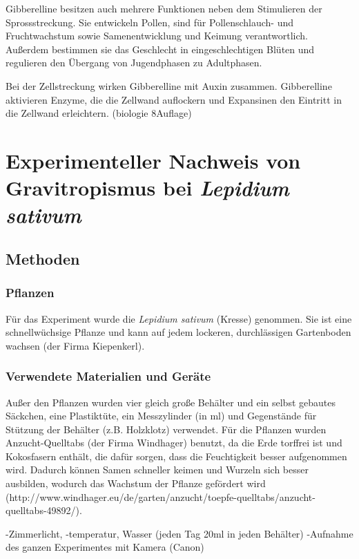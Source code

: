 \documentclass[
a4paper, 
11pt, 
ngerman,
listof=totoc,
bibliography=totocnumbered,
abstracton
]{scrreprt}
\begin{document}
Gibberelline besitzen auch mehrere Funktionen neben dem Stimulieren der Sprossstreckung.
Sie entwickeln Pollen, sind für Pollenschlauch- und Fruchtwachstum sowie Samenentwicklung und Keimung verantwortlich. Außerdem bestimmen sie das Geschlecht in eingeschlechtigen Blüten und regulieren den Übergang von Jugendphasen zu Adultphasen. 

Bei der Zellstreckung wirken Gibberelline mit Auxin zusammen. Gibberelline aktivieren Enzyme, die die Zellwand auflockern und Expansinen den Eintritt in die Zellwand erleichtern. (biologie 8Auflage) 




\chapter{Experimenteller Nachweis von Gravitropismus bei \emph{Lepidium sativum}}

\section{Methoden}

\subsection{Pflanzen}

Für das Experiment wurde die \emph{Lepidium sativum} (Kresse) genommen. Sie ist eine schnellwüchsige Pflanze und kann auf jedem lockeren, durchlässigen Gartenboden wachsen (der Firma Kiepenkerl).



\subsection{Verwendete Materialien und Geräte}
Außer den Pflanzen wurden vier gleich große Behälter und ein selbst gebautes Säckchen, eine Plastiktüte, ein Messzylinder (in ml) und Gegenstände für Stützung der Behälter (z.B. Holzklotz) verwendet. Für die Pflanzen wurden Anzucht-Quelltabs (der Firma Windhager) benutzt, da die Erde torffrei ist und Kokosfasern enthält, die dafür sorgen, dass die Feuchtigkeit besser aufgenommen wird. Dadurch können Samen schneller keimen und Wurzeln sich besser ausbilden, wodurch das Wachstum der Pflanze gefördert wird (http://www.windhager.eu/de/garten/anzucht/toepfe-quelltabs/anzucht-quelltabs-49892/). 

-Zimmerlicht, -temperatur, Wasser (jeden Tag 20ml in jeden Behälter)
-Aufnahme des ganzen Experimentes mit Kamera (Canon)
\end{document}
